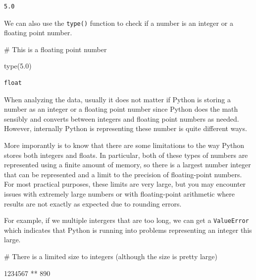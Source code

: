 \documentclass[
  letterpaper,
  DIV=11,
  numbers=noendperiod]{scrreprt}
\newenvironment{Shaded}{\begin{snugshade}}{\end{snugshade}}
\newcommand{\BuiltInTok}[1]{\textcolor[rgb]{0.00,0.23,0.31}{#1}}
\newcommand{\CommentTok}[1]{\textcolor[rgb]{0.37,0.37,0.37}{#1}}
\newcommand{\DecValTok}[1]{\textcolor[rgb]{0.68,0.00,0.00}{#1}}
\newcommand{\FloatTok}[1]{\textcolor[rgb]{0.68,0.00,0.00}{#1}}
\newcommand{\NormalTok}[1]{\textcolor[rgb]{0.00,0.23,0.31}{#1}}
\newcommand{\OperatorTok}[1]{\textcolor[rgb]{0.37,0.37,0.37}{#1}}
\begin{document}
\begin{verbatim}
5.0
\end{verbatim}

We can also use the \texttt{type()} function to check if a number is an
integer or a floating point number.

\begin{Shaded}
\begin{Highlighting}[]
\CommentTok{\# This is a floating point number}

\BuiltInTok{type}\NormalTok{(}\FloatTok{5.0}\NormalTok{)}
\end{Highlighting}
\end{Shaded}

\begin{verbatim}
float
\end{verbatim}

When analyzing the data, usually it does not matter if Python is storing
a number as an integer or a floating point number since Python does the
math sensibly and converts between integers and floating point numbers
as needed. However, internally Python is representing these number is
quite different ways.

More imporantly is to know that there are some limitations to the way
Python stores both integers and floats. In particular, both of these
types of numbers are represented using a finite amount of memory, so
there is a largest number integer that can be represented and a limit to
the precision of floating-point numbers. For most practical purposes,
these limits are very large, but you may encounter issues with extremely
large numbers or with floating-point arithmetic where results are not
exactly as expected due to rounding errors.

For example, if we multiple intergers that are too long, we can get a
\texttt{ValueError} which indicates that Python is running into problems
representing an integer this large.

\begin{Shaded}
\begin{Highlighting}[]
\CommentTok{\# There is a limited size to integers (although the size is pretty large)}

\DecValTok{1234567} \OperatorTok{**} \DecValTok{890} 
\end{Highlighting}
\end{Shaded}
\end{document}
